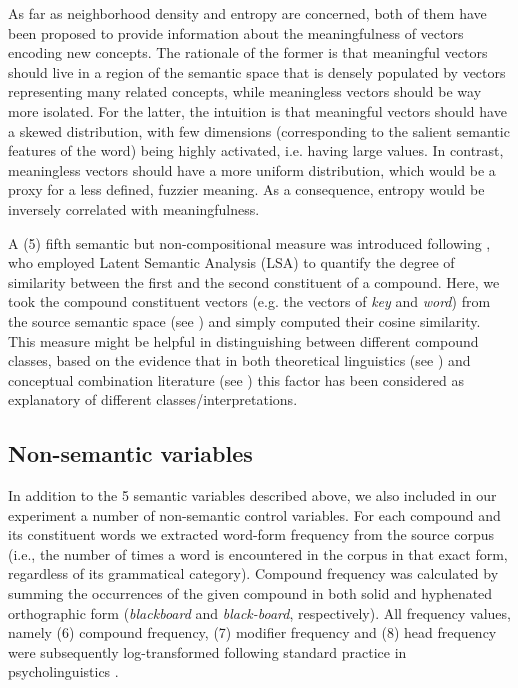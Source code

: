 \documentclass[output=paper]{langsci/langscibook}
\begin{document}
As far as neighborhood density and entropy are concerned, both of them have been proposed to provide information about the meaningfulness of vectors encoding new concepts. The rationale of the former is that meaningful vectors should live in a region of the semantic space that is densely populated by vectors representing many related concepts, while meaningless vectors should be way more isolated. For the latter, the intuition is that meaningful vectors should have a skewed distribution, with few dimensions (corresponding to the salient semantic features of the word) being highly activated, i.e. having large values. In contrast, meaningless vectors should have a more uniform distribution, which would be a proxy for a less defined, fuzzier meaning. As a consequence, entropy would be inversely correlated with meaningfulness.

A (5) fifth semantic but non-compositional measure was introduced following \cite{lynott2001}, who employed Latent Semantic Analysis (LSA) to quantify the degree of similarity between the first and the second constituent of a compound. Here, we took the compound constituent vectors (e.g. the vectors of \emph{key} and \emph{word}) from the source semantic space (see ) and simply computed their cosine similarity. This measure might be helpful in distinguishing between different compound classes, based on the evidence that in both theoretical linguistics (see \citealt{lieber5OHC}) and conceptual combination literature (see \citealt{wisniewski1996}) this factor has been considered as explanatory of different classes/interpretations.

\subsection{Non-semantic variables}\largerpage

In addition to the 5 semantic variables described above, we also included in our experiment a number of non-semantic control variables. For each compound and its constituent words we extracted word-form frequency from the source corpus (i.e., the number of times a word is encountered in the corpus in that exact form, regardless of its grammatical category). Compound frequency was calculated by summing the occurrences of the given compound in both solid and hyphenated orthographic form (\emph{blackboard} and \emph{black-board}, respectively). All frequency values, namely (6) compound frequency, (7) modifier frequency and (8) head frequency were subsequently log-transformed following standard practice in psycholinguistics \citep{brysbaert2018}.
\end{document}
